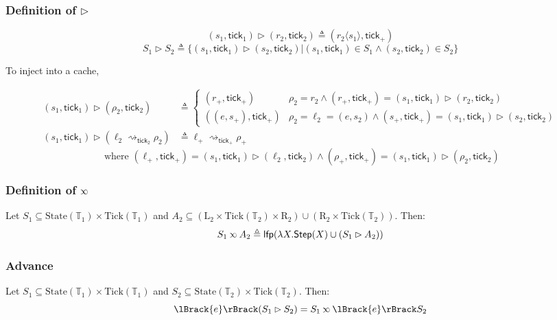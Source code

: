 \documentclass{beamer}
\newcommand*{\Time}{\mathbb{T}}
\newcommand*{\Left}{\text{L}}
\newcommand*{\Right}{\text{R}}
\newcommand*{\State}{\text{State}}
\newcommand*{\Tick}{\text{Tick}}
\newcommand*{\semarrow}{\rightsquigarrow}
\newcommand*{\semlink}{\mathbin{\rotatebox[origin=c]{180}{$\propto$}}}
\newcommand*{\sembracket}[1]{\lBrack{#1}\rBrack}
\newcommand*{\tick}{\mathsf{tick}}
\newcommand*{\inject}[2]{{#2}\langle{#1}\rangle}
\begin{document}
\begin{frame}[c]
  \frametitle{Definition of $\rhd$}
  \begin{definition}
    \[(s_1,\tick_1)\rhd(r_2,\tick_2)\triangleq(\inject{s_1}{r_2},\tick_+)\]
    \[S_1\rhd S_2\triangleq\{(s_1,\tick_1)\rhd(s_2,\tick_2)|(s_1,\tick_1)\in S_1\wedge(s_2,\tick_2)\in S_2\}\]
  \end{definition}
  To inject into a cache,
  \begin{figure}[h!]
    \scriptsize
    \begin{align*}
      (s_1,\tick_1)\rhd(\rho_2,\tick_2)                  & \triangleq
      \begin{cases}
        (r_+,\tick_+)     & \rho_2=r_2\wedge(r_+,\tick_+)=(s_1,\tick_1)\rhd(r_2,\tick_2)            \\
        ((e,s_+),\tick_+) & \rho_2=\ell_2=(e,s_2)\wedge(s_+,\tick_+)=(s_1,\tick_1)\rhd(s_2,\tick_2)
      \end{cases} \\
      (s_1,\tick_1)\rhd(\ell_2\semarrow_{\tick_2}\rho_2) & \triangleq
      \ell_+\semarrow_{\tick_+}\rho_+
    \end{align*}
    \[
      \text{ where }
      (\ell_+,\tick_+)=(s_1,\tick_1)\rhd(\ell_2,\tick_2)\wedge
      (\rho_+,\tick_+)=(s_1,\tick_1)\rhd(\rho_2,\tick_2)
    \]
  \end{figure}
\end{frame}
\begin{frame}[c]
  \frametitle{Definition of $\semlink$}
  \begin{definition}
    Let $S_1\subseteq\State(\Time_1)\times\Tick(\Time_1)$ and $A_2\subseteq(\Left_2\times\Tick(\Time_2)\times\Right_2)\cup(\Right_2\times\Tick(\Time_2))$.
    Then:
    \[
      S_1\semlink A_2\triangleq
      \mathsf{lfp}(\lambda X.\mathsf{Step}(X)\cup(S_1\rhd A_2))
    \]
  \end{definition}
\end{frame}
\begin{frame}[c]
  \frametitle{Advance}
  \begin{lemma}[Advance]
    Let $S_1\subseteq\State(\Time_1)\times\Tick(\Time_1)$ and $S_2\subseteq\State(\Time_2)\times\Tick(\Time_2)$. Then:
    \[
      \sembracket{e}(S_1\rhd S_2)=S_1\semlink\sembracket{e}S_2
    \]
  \end{lemma}
\end{frame}
\end{document}

